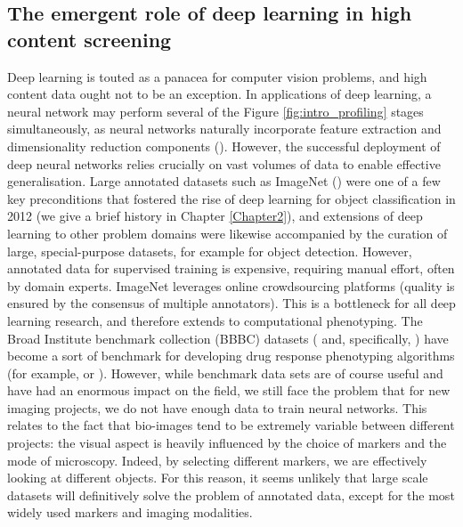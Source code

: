 \subsection{The emergent role of deep learning in high content screening}

Deep learning is touted as a panacea for computer vision problems, and high content data ought not to be an exception. In applications of deep learning, a neural network may perform several of the Figure \ref{fig:intro_profiling} stages simultaneously, as neural networks naturally incorporate feature extraction and dimensionality reduction components (\cite{sommer2017deep}). However, the successful deployment of deep neural networks relies crucially on vast volumes of data to enable effective generalisation. Large annotated datasets such as ImageNet (\cite{russakovsky2015imagenet}) were one of a few key preconditions that fostered the rise of deep learning for object classification in 2012 (we give a brief history in Chapter \ref{Chapter2}), and extensions of deep learning to other problem domains were likewise accompanied by the curation of large, special-purpose datasets, for example \cite{lin2014microsoft} for object detection. However, annotated data for supervised training is expensive, requiring manual effort, often by domain experts. ImageNet leverages online crowdsourcing platforms (quality is ensured by the consensus of multiple annotators). This is a bottleneck for all deep learning research, and therefore extends to computational phenotyping. The Broad Institute benchmark collection (BBBC) datasets (\cite{ljosa2012annotated} and, specifically, \cite{caie2010high}) have become a sort of benchmark for developing drug response phenotyping algorithms (for example, \cite{kraus2016classifying} or \cite{kandaswamy2016high}). However, while benchmark data sets are of course useful and have had an enormous impact on the field, we still face the problem that for new imaging projects, we do not have enough data to train neural networks. This relates to the fact that bio-images tend to be extremely variable between different projects: the visual aspect is heavily influenced by the choice of markers and the mode of microscopy. Indeed, by selecting different markers, we are effectively looking at different objects. For this reason, it seems unlikely that large scale datasets will definitively solve the problem of annotated data, except for the most widely used markers and imaging modalities.


